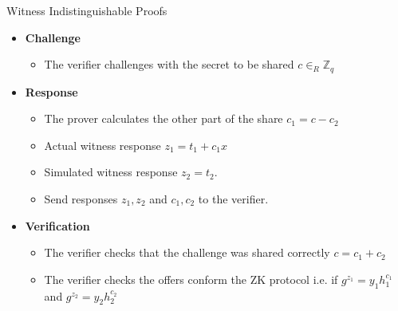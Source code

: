\documentclass{beamer}
\begin{document}
\begin{frame}[allowframebreaks]{Witness Indistinguishable Proofs}
\begin{itemize}
\begin{itemize}
\tiny
\item For the actual witness $x_1$ calculate $y_1 = g^{t_1}$ where $ t_1 \in_R \mathbb{Z}_q $
\item For $x_2$ the prover calculates $y_2 = g^{t_2}h_2^{-c_2}$ where $t_2 \in_R \mathbb{Z}_q$ and $c_2 \in_R \mathbb{Z}_q$ (interpret as random share of the challenge).
\item Send $y_1,y_2$ to the verifier.
\end{itemize}
\item \textbf{Challenge}

\begin{itemize}
\tiny
\item The verifier challenges with the secret to be shared $c \in_R \mathbb{Z}_q$
\end{itemize}
\item \textbf{Response}

\begin{itemize}
\tiny
\item The prover calculates the other part of the share $c_1 = c - c_2$
\item Actual witness response $z_1 = t_1 + c_1 x$
\item Simulated witness response $z_2=t_2$.
\item Send responses $z_1,z_2$ and $c_1, c_2$ to the verifier. 
\end{itemize}
\item \textbf{Verification}

\begin{itemize}
\tiny
\item The verifier checks that the challenge was shared correctly $c = c_1 + c_2$
\item The verifier checks the offers conform the ZK protocol i.e. if $g^{z_1} = y_1 h_1^{c_1}$ and $g^{z_2} = y_2 h_2^{c_2}$
\end{itemize}
\end{itemize}
 

\end{frame}
\end{document}

